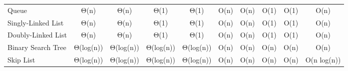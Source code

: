 \begin{table}[]
\begin{tabular}{lccccccccc}
    \rowcolor[HTML]{FFFF10} 
    \cellcolor[HTML]{F1ECB6}Queue                                                                       & Θ(n)                              & Θ(n)                              & \cellcolor[HTML]{3EC509}Θ(1)      & \cellcolor[HTML]{3EC509}Θ(1)      & O(n)                          & O(n)                          & \cellcolor[HTML]{3EC509}O(1)     & \cellcolor[HTML]{3EC509}O(1)    & O(n)                                                                   \\
    \rowcolor[HTML]{FFFF10} 
    \cellcolor[HTML]{F1ECB6}Singly-Linked List                                                          & Θ(n)                              & Θ(n)                              & \cellcolor[HTML]{3EC509}Θ(1)      & \cellcolor[HTML]{3EC509}Θ(1)      & O(n)                          & O(n)                          & \cellcolor[HTML]{3EC509}O(1)     & \cellcolor[HTML]{3EC509}O(1)    & O(n)                                                                   \\
    \rowcolor[HTML]{FFFF10} 
    \cellcolor[HTML]{F1ECB6}Doubly-Linked List                                                          & Θ(n)                              & Θ(n)                              & \cellcolor[HTML]{3EC509}Θ(1)      & \cellcolor[HTML]{3EC509}Θ(1)      & O(n)                          & O(n)                          & \cellcolor[HTML]{3EC509}O(1)     & \cellcolor[HTML]{3EC509}O(1)    & O(n)                                                                   \\
    \rowcolor[HTML]{FFFF10} 
    \cellcolor[HTML]{F1ECB6}Binary Search Tree                                                          & \cellcolor[HTML]{B1EA0D}Θ(log(n)) & \cellcolor[HTML]{B1EA0D}Θ(log(n)) & \cellcolor[HTML]{B1EA0D}Θ(log(n)) & \cellcolor[HTML]{B1EA0D}Θ(log(n)) & O(n)                          & O(n)                          & O(n)                             & O(n)                            & O(n)                                                                   \\
    \cellcolor[HTML]{F1ECB6}Skip List                                                                   & \cellcolor[HTML]{B1EA0D}Θ(log(n)) & \cellcolor[HTML]{B1EA0D}Θ(log(n)) & \cellcolor[HTML]{B1EA0D}Θ(log(n)) & \cellcolor[HTML]{B1EA0D}Θ(log(n)) & \cellcolor[HTML]{FFFF10}O(n)  & \cellcolor[HTML]{FFFF10}O(n)  & \cellcolor[HTML]{FFFF10}O(n)     & \cellcolor[HTML]{FFFF10}O(n)    & \cellcolor[HTML]{FCAD29}O(n log(n))                                    \\

\end{tabular}
\end{table}
